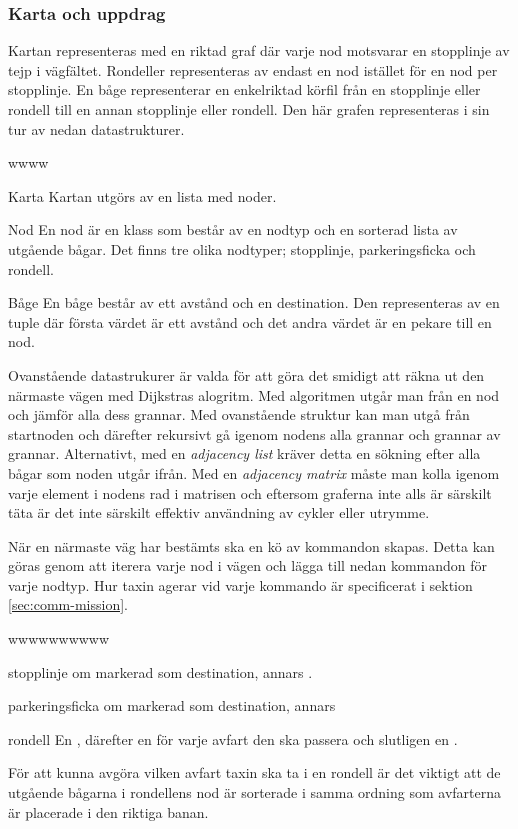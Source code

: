 \documentclass[designspec/spec.tex]{subfiles}
\begin{document}
\subsubsection{Karta och uppdrag}
Kartan representeras med en riktad graf där varje nod motsvarar en stopplinje
av tejp i vägfältet. Rondeller representeras av endast en nod istället för en
nod per stopplinje. En båge representerar en enkelriktad körfil från en
stopplinje eller rondell till en annan stopplinje eller rondell. Den här grafen
representeras i sin tur av nedan datastrukturer.

\begin{labeling}{wwww}
    \item[Karta] Kartan utgörs av en lista med noder.

    \item[Nod] En nod är en klass som består av en nodtyp och en sorterad lista
        av utgående bågar. Det finns tre olika nodtyper; stopplinje,
        parkeringsficka och rondell. 

    \item[Båge] En båge består av ett avstånd och en destination. Den
        representeras av en tuple där första värdet är ett avstånd och det
        andra värdet är en pekare till en nod.
\end{labeling}
Ovanstående datastrukurer är valda för att göra det smidigt att räkna ut den närmaste
vägen med Dijkstras alogritm. Med algoritmen utgår man från en nod och jämför
alla dess grannar. Med ovanstående struktur kan man utgå från startnoden och därefter
rekursivt gå igenom nodens alla grannar och grannar av grannar. Alternativt,
med en \textit{adjacency list} kräver detta en sökning efter alla bågar som
noden utgår ifrån. Med en \textit{adjacency matrix} måste man kolla igenom
varje element i nodens rad i matrisen och eftersom graferna inte alls är
särskilt täta är det inte särskilt effektiv användning av cykler eller utrymme. 

När en närmaste väg har bestämts ska en kö av kommandon skapas. Detta kan göras
genom att iterera varje nod i vägen och lägga till nedan kommandon för varje
nodtyp. Hur taxin agerar vid varje kommando är specificerat i sektion
\ref{sec:comm-mission}.
\begin{labeling}{wwwwwwwwww}
\item[stopplinje] {\commStop} om markerad som destination, annars \commIgnore.
\item[parkeringsficka] {\commPark} om markerad som destination, annars
    \commIgnore
\item[rondell] En \commEnter, därefter en {\commIgnore} för varje avfart den ska
    passera och slutligen en \commExit.
\end{labeling}
För att kunna avgöra vilken avfart taxin ska ta i en rondell är det viktigt att
de utgående bågarna i rondellens nod är sorterade i samma ordning som
avfarterna är placerade i den riktiga banan.
\end{document}
